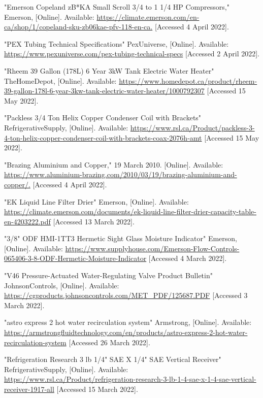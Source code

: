 \documentclass{ucalgarythesis}
\begin{document}
\begin{thebibliography}{9}
     "Emerson Copeland zB*KA Small Scroll 3/4 to 1 1/4 HP Compressors," Emerson, [Online]. Available: \url{https://climate.emerson.com/en-ca/shop/1/copeland-sku-zb06kae-pfv-118-en-ca.} [Accessed 4 April 2022]. 
    
     "PEX Tubing Technical Specifications" PexUniverse, [Online]. Available: \url{https://www.pexuniverse.com/pex-tubing-technical-specs} [Accessed 2 April 2022]. 
    
     "Rheem 39 Gallon (178L) 6 Year 3kW Tank Electric Water Heater" TheHomeDepot, [Online]. Available: \url{https://www.homedepot.ca/product/rheem-39-gallon-178l-6-year-3kw-tank-electric-water-heater/1000792307} [Accessed 15 May 2022]. 
    
     "Packless 3/4 Ton Helix Copper Condenser Coil with Brackets" RefrigerativeSupply, [Online]. Available: \url{https://www.rsl.ca/Product/packless-3-4-ton-helix-copper-condenser-coil-with-brackets-coax-2076h-amt} [Accessed 15 May 2022]. 
    
     "Brazing Aluminium and Copper," 19 March 2010. [Online]. Available: \url {https://www.aluminium-brazing.com/2010/03/19/brazing-aluminium-and-copper/.} [Accessed 4 April 2022].
    
     "EK Liquid Line Filter Drier" Emerson, [Online]. Available: \url{https://climate.emerson.com/documents/ek-liquid-line-filter-drier-capacity-table-en-4203222.pdf} [Accessed 13 March 2022].
    
     "3/8" ODF HMI-1TT3 Hermetic Sight Glass Moisture Indicator" Emerson, [Online]. Available: \url{https://www.supplyhouse.com/Emerson-Flow-Controls-065406-3-8-ODF-Hermetic-Moisture-Indicator} [Accessed  4 March 2022].
    
     "V46 Pressure-Actuated Water-Regulating Valve
    Product Bulletin" JohnsonControls, [Online]. Available: \url{https://cgproducts.johnsoncontrols.com/MET_PDF/125687.PDF} [Accessed  3 March 2022].
    
     "astro express 2 hot water recirculation system" Armstrong, [Online]. Available: \url{https://armstrongfluidtechnology.com/en/products/astro-express-2-hot-water-recirculation-system} [Accessed  26 March 2022].
    
     "Refrigeration Research 3 lb 1/4" SAE X 1/4" SAE Vertical Receiver" RefrigerativeSupply, [Online]. Available: \url{https://www.rsl.ca/Product/refrigeration-research-3-lb-1-4-sae-x-1-4-sae-vertical-receiver-1917-all} [Accessed  15 March 2022].
    
\end{thebibliography}


\appendix





\end{document}
